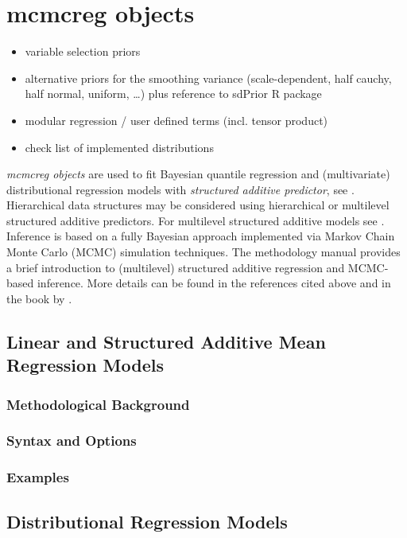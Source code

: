 \chapter{mcmcreg objects}
\label{mcmcreg} 

\begin{itemize}
 \item variable selection priors
 \item alternative priors for the smoothing variance (scale-dependent, half cauchy, half normal, uniform, \ldots) plus reference to sdPrior R package
 \item modular regression / user defined terms (incl. tensor product)
 \item check list of implemented distributions
\end{itemize}

{\em mcmcreg objects} are used to fit Bayesian quantile regression and (multivariate) distributional regression models with {\em
structured additive predictor}, see . Hierarchical data structures may be considered using
hierarchical or multilevel structured additive predictors. For multilevel structured additive models  see
. Inference is based on a fully Bayesian approach implemented via Markov Chain Monte Carlo (MCMC)
simulation techniques. The methodology manual provides a brief introduction to (multilevel) structured additive regression and MCMC-based
inference. More details can be found in the references cited above and in the book by .

\section{Linear and Structured Additive Mean Regression Models}

\subsection{Methodological Background}

\subsection{Syntax and Options}

\subsection{Examples}

\section{Distributional Regression Models}

